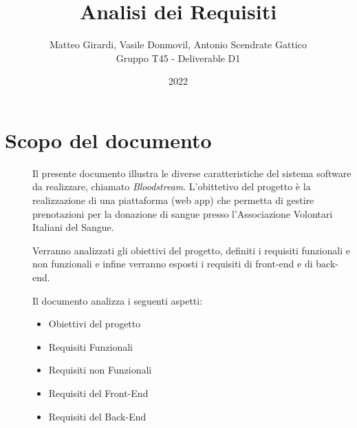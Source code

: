 \documentclass{article}
\title{\textbf{\Huge Analisi dei Requisiti}}
\author{Matteo Girardi, Vasile Donmovil, Antonio Scendrate Gattico \\ Gruppo T45 - Deliverable D1}
\date{2022}
\begin{document}
\maketitle

\clearpage
\tableofcontents
\clearpage

\section{Scopo del documento}
\begin{description}
    \item[] Il presente documento illustra le diverse caratteristiche del sistema software da realizzare, chiamato \textit{Bloodstream}. L’obittetivo del progetto è la realizzazione di una piattaforma (web app) che permetta di gestire prenotazioni per la donazione di sangue presso l’Associazione Volontari Italiani del Sangue.
    \item[] Verranno analizzati gli obiettivi del progetto, definiti i requisiti funzionali e non funzionali e infine verranno esposti i requisiti di front-end e di back-end.
    \item[] Il documento analizza i seguenti aspetti:
    	\begin{itemize}
    	\item Obiettivi del progetto
    	\item Requisiti Funzionali
    	\item Requisiti non Funzionali
    	\item Requisiti del Front-End
    	\item Requisiti del Back-End
    	\end{itemize}
\end{description}
\clearpage
\end{document}

